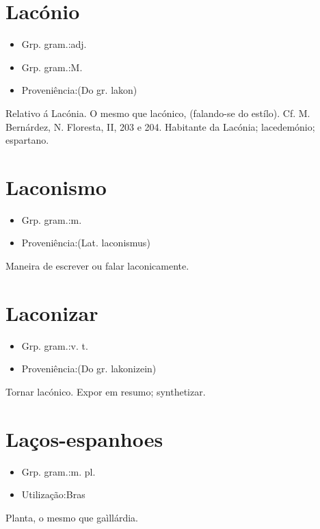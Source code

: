 \section{Lacónio}
\begin{itemize}
\item {Grp. gram.:adj.}
\end{itemize}
\begin{itemize}
\item {Grp. gram.:M.}
\end{itemize}
\begin{itemize}
\item {Proveniência:(Do gr. \textunderscore lakon\textunderscore )}
\end{itemize}
Relativo á Lacónia.
O mesmo que \textunderscore lacónico\textunderscore , (falando-se do estílo). Cf. M. Bernárdez, \textunderscore N. Floresta\textunderscore , II, 203 e 204.
Habitante da Lacónia; lacedemónio; espartano.
\section{Laconismo}
\begin{itemize}
\item {Grp. gram.:m.}
\end{itemize}
\begin{itemize}
\item {Proveniência:(Lat. \textunderscore laconismus\textunderscore )}
\end{itemize}
Maneira de escrever ou falar laconicamente.
\section{Laconizar}
\begin{itemize}
\item {Grp. gram.:v. t.}
\end{itemize}
\begin{itemize}
\item {Proveniência:(Do gr. \textunderscore lakonizein\textunderscore )}
\end{itemize}
Tornar lacónico.
Expor em resumo; synthetizar.
\section{Laços-espanhoes}
\begin{itemize}
\item {Grp. gram.:m. pl.}
\end{itemize}
\begin{itemize}
\item {Utilização:Bras}
\end{itemize}
Planta, o mesmo que \textunderscore gaìllárdia\textunderscore .
